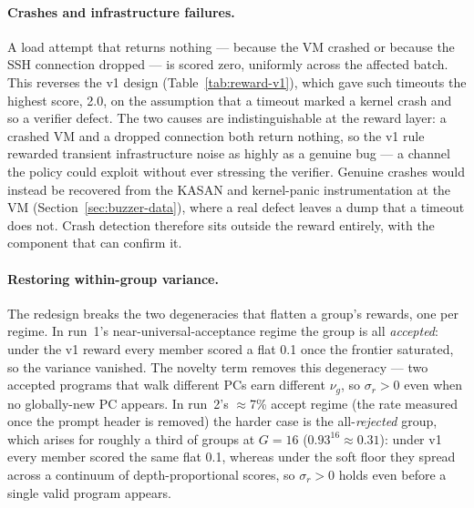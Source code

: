 \paragraph{Crashes and infrastructure failures.}
A load attempt that returns nothing --- because the VM crashed or because the SSH
connection dropped --- is scored zero, uniformly across the affected batch. This
reverses the v1 design (Table~\ref{tab:reward-v1}), which gave such timeouts the
highest score, 2.0, on the assumption that a timeout marked a kernel crash and so a
verifier defect. The two causes are indistinguishable at the reward layer: a
crashed VM and a dropped connection both return nothing, so the v1 rule rewarded
transient infrastructure noise as highly as a genuine bug --- a channel the policy
could exploit without ever stressing the verifier. Genuine crashes would instead be
recovered from the KASAN and kernel-panic instrumentation at the VM
(Section~\ref{sec:buzzer-data}), where a real defect leaves a dump that a timeout
does not. Crash detection therefore sits outside the reward entirely, with the
component that can confirm it.

\paragraph{Restoring within-group variance.}
The redesign breaks the two degeneracies that flatten a group's rewards, one per
regime. In run~1's near-universal-acceptance regime the group is all
\emph{accepted}: under the v1 reward every member scored a flat 0.1 once the
frontier saturated, so the variance vanished. The novelty term removes this
degeneracy --- two accepted programs that walk different PCs earn different
$\nu_g$, so $\sigma_r > 0$ even when no globally-new PC appears. In run~2's
$\approx$7\% accept regime (the rate measured once the prompt header is removed) the
harder case is the all-\emph{rejected} group, which arises for roughly a third of
groups at $G=16$ ($0.93^{16}\approx0.31$): under v1 every member scored the same flat
0.1, whereas under the soft floor they spread across a continuum of
depth-proportional scores, so $\sigma_r > 0$ holds even before a single valid program
appears.

